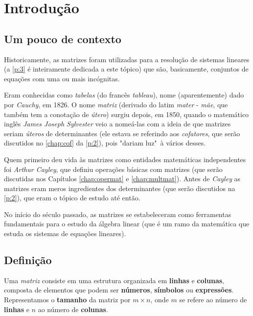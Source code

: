 \chapter{Introdução}

\section{Um pouco de contexto}

Historicamente, as matrizes foram utilizadas para a resolução de sistemas lineares (a \autoref{p:3} é inteiramente dedicada a este tópico) que são, basicamente, conjuntos de equações com uma ou mais incógnitas.

Eram conhecidas como \textit{tabelas} (do francês \textit{tableau}), nome (aparentemente) dado por \textit{Cauchy}, em 1826. O nome \textit{matriz} (derivado do latim \textit{mater} - \textit{mãe}, que também tem a conotação de \textit{útero}) surgiu depois, em 1850, quando o matemático inglês \textit{James Joseph Sylvester} veio a nomeá-las com a ideia de que matrizes seriam \textit{úteros} de determinantes (ele estava se referindo aos \textit{cofatores}, que serão discutidos no \autoref{chap:cof} da \autoref{p:2}), pois "dariam luz"~à vários desses.

Quem primeiro deu vida às matrizes como entidades matemáticas independentes foi \textit{Arthur Cayley}, que definiu operações básicas com matrizes (que serão discutidas nos Capítulos \ref{chap:opermat} e \ref{chap:multmat}). Antes de \textit{Cayley} as matrizes eram meros ingredientes dos determinantes (que serão discutidos na \autoref{p:2}), que eram o tópico de estudo até então.

No início do século passado, as matrizes se estabeleceram como ferramentas fundamentais para o estudo da álgebra linear (que é um ramo da matemática que estuda os sistemas de equações lineares).

\section{Definição}

Uma \textit{matriz} consiste em uma estrutura organizada em \textbf{linhas} e \textbf{colunas}, composta de elementos que podem ser \textbf{números}, \textbf{símbolos} ou \textbf{expressões}. Representamos o \textbf{tamanho} da matriz por $m \times n$, onde $m$ se refere ao número de \textbf{linhas} e $n$ ao número de \textbf{colunas}.

